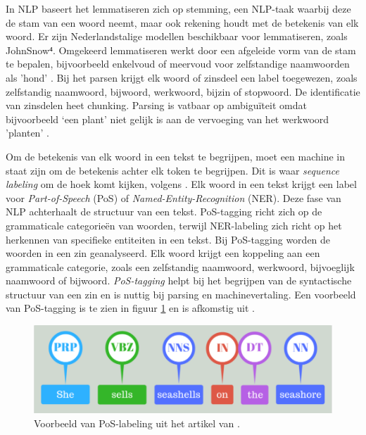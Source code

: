 \medspace

In NLP baseert het lemmatiseren zich op stemming, een NLP-taak waarbij deze de stam van een woord neemt, maar ook rekening houdt met de betekenis van elk woord. Er zijn Nederlandstalige modellen beschikbaar voor lemmatiseren, zoals JohnSnow⁴. Omgekeerd lemmatiseren werkt door een afgeleide vorm van de stam te bepalen, bijvoorbeeld enkelvoud of meervoud voor zelfstandige naamwoorden als ’hond’ \autocite{Eisenstein2019}. Bij het parsen krijgt elk woord of zinsdeel een label toegewezen, zoals zelfstandig naamwoord, bijwoord, werkwoord, bijzin of stopwoord. De identificatie van zinsdelen heet chunking. Parsing is vatbaar op ambiguïteit omdat bijvoorbeeld ‘een plant’ niet gelijk is aan de vervoeging van het werkwoord ’planten’ \autocite{Eisenstein2019}.

\medspace

Om de betekenis van elk woord in een tekst te begrijpen, moet een machine in staat zijn om de betekenis achter elk token te begrijpen. Dit is waar \textit{sequence labeling} om de hoek komt kijken, volgens \textcite{Eisenstein2019}. Elk woord in een tekst krijgt een label voor \textit{Part-of-Speech} (PoS) of \textit{Named-Entity-Recognition} (NER). Deze fase van NLP achterhaalt de structuur van een tekst. PoS-tagging richt zich op de grammaticale categorieën van woorden, terwijl NER-labeling zich richt op het herkennen van specifieke entiteiten in een tekst. Bij PoS-tagging worden de woorden in een zin geanalyseerd. Elk woord krijgt een koppeling aan een grammaticale categorie, zoals een zelfstandig naamwoord, werkwoord, bijvoeglijk naamwoord of bijwoord. \textit{PoS-tagging} helpt bij het begrijpen van de syntactische structuur van een zin en is nuttig bij parsing en machinevertaling. Een voorbeeld van PoS-tagging is te zien in figuur \ref{fig:pos-labeling} en is afkomstig uit \textcite{Bilisci2021}.

\begin{center}
	\begin{figure}[H]
		\includegraphics[width=15cm]{img/poslabeling.png}
		\caption{Voorbeeld van PoS-labeling uit het artikel van \textcite{Bilisci2021}.}
		\label{fig:pos-labeling}
	\end{figure}
\end{center}

